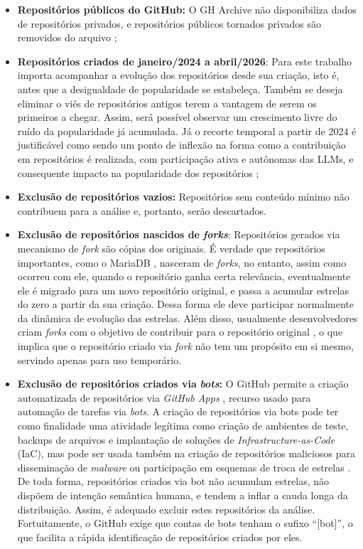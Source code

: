 \documentclass[12pt,oneside,a4paper,brazil,sumario=tradicional]{abntex2}
\begin{document}
\begin{itemize}
  \item \textbf{Repositórios públicos do GitHub:} O GH Archive não disponibiliza dados de repositórios privados, e repositórios públicos tornados privados são removidos do arquivo \parencite{github_archive_faq};
  \item \textbf{Repositórios criados de janeiro/2024 a abril/2026}: Para este trabalho importa acompanhar a evolução dos repositórios desde sua criação, isto é, antes que a desigualdade de popularidade se estabeleça. Também se deseja eliminar o viés de repositórios antigos terem a vantagem de serem os primeiros a chegar. Assim, será possível observar um crescimento livre do ruído da popularidade já acumulada. Já o recorte temporal a partir de 2024 é justificável como sendo um ponto de inflexão na forma como a contribuição em repositórios é realizada, com participação ativa e autônomas das LLMs, e consequente impacto na popularidade dos repositórios \parencite{gu2026, popescu2026, taillandier2026};
  \item \textbf{Exclusão de repositórios vazios:} Repositórios sem conteúdo mínimo não contribuem para a análise e, portanto, serão descartados.
  \item \textbf{Exclusão de repositórios nascidos de }\textbf{\textit{forks}}: Repositórios gerados via mecanismo de \textit{fork }são cópias dos originais. É verdade que repositórios importantes, como o MariaDB \parencite{mariadb_about}, nasceram de \textit{forks}, no entanto, assim como ocorreu com ele, quando o repositório ganha certa relevância, eventualmente ele é migrado para um novo repositório original, e passa a acumular estrelas do zero a partir da sua criação. Dessa forma ele deve participar normalmente da dinâmica de evolução das estrelas. Além disso, usualmente desenvolvedores criam \textit{forks }com o objetivo de contribuir para o repositório original \parencite{jiang2017}, o que implica que o repositório criado via \textit{fork }não tem um propósito em si mesmo, servindo apenas para uso temporário.
  \item \textbf{Exclusão de repositórios criados via }\textbf{\textit{bots}}\textbf{: }O GitHub permite a criação automatizada de repositórios via \textit{GitHub Apps }\parencite{github_deciding_app}, recurso usado para automação de tarefas via \textit{bots}. A criação de repositórios via bots pode ter como finalidade uma atividade legítima como criação de ambientes de teste, backups de arquivos e implantação de soluções de \textit{Infrastructure-as-Code} (IaC), mas pode ser usada também na criação de repositórios maliciosos para disseminação de \textit{malware }ou participação em esquemas de troca de estrelas \parencite{he2025b}. De toda forma, repositórios criados via bot não acumulam estrelas, não dispõem de intenção semântica humana, e tendem a inflar a cauda longa da distribuição. Assim, é adequado excluir estes repositórios da análise. Fortuitamente, o GitHub exige que contas de bots tenham o sufixo “[bot]”, o que facilita a rápida identificação de repositórios criados por eles.

\end{itemize}
\end{document}
